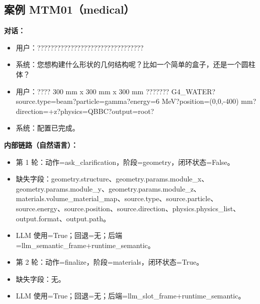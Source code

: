 \documentclass[11pt]{ctexart}
\begin{document}
\subsection{案例 MTM01（medical）}
\textbf{对话：}
\begin{itemize}
\item 用户：????????????????????????????????
\item 系统：您想构建什么形状的几何结构呢？比如一个简单的盒子，还是一个圆柱体？
\item 用户：???? 300 mm x 300 mm x 300 mm ??????? G4\_WATER?source.type=beam?particle=gamma?energy=6 MeV?position=(0,0,-400) mm?direction=+z?physics=QBBC?output=root?
\item 系统：配置已完成。
\end{itemize}
\textbf{内部链路（自然语言）：}
\begin{itemize}
\item 第 1 轮：动作=ask\_clarification，阶段=geometry，闭环状态=False。
\item 缺失字段：geometry.structure、geometry.params.module\_x、geometry.params.module\_y、geometry.params.module\_z、materials.volume\_material\_map、source.type、source.particle、source.energy、source.position、source.direction、physics.physics\_list、output.format、output.path。
\item LLM 使用=True；回退=无；后端=llm\_semantic\_frame+runtime\_semantic。
\item 第 2 轮：动作=finalize，阶段=materials，闭环状态=True。
\item 缺失字段：无。
\item LLM 使用=True；回退=无；后端=llm\_slot\_frame+runtime\_semantic。
\end{itemize}
\end{document}
